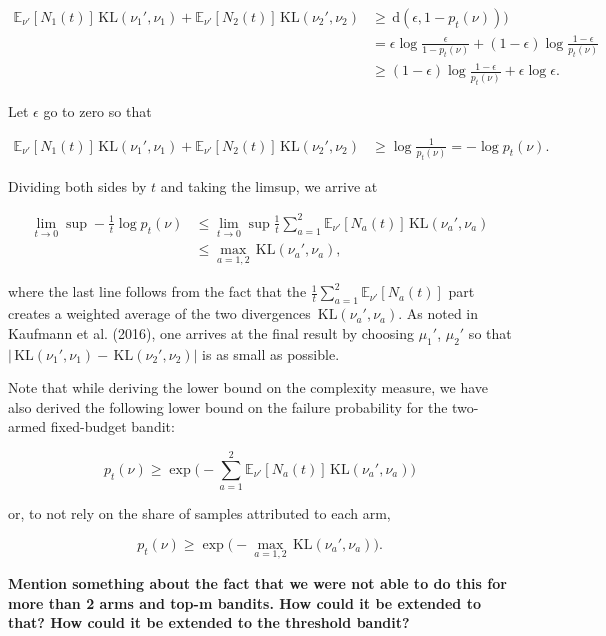 \documentclass[12pt,]{article}
\newcommand{\KL}{\,\text{KL}}
\newcommand{\der}{\,\text{d}}
\begin{document}
\begin{align*}
\mathbb{E}_{\nu'}[N_1(t)]\KL(\nu_1', \nu_1) + \mathbb{E}_{\nu'}[N_2(t)]\KL(\nu_2', \nu_2) & \geq \der(\epsilon,1-p_t(\nu))) \\
& = \epsilon \log \frac{\epsilon}{1-p_t(\nu)} + (1-\epsilon) \log \frac{1-\epsilon}{p_t(\nu)} \\
& \geq (1-\epsilon) \log \frac{1-\epsilon}{p_t(\nu)} + \epsilon \log \epsilon.
\end{align*}

Let \(\epsilon\) go to zero so that

\begin{align*}
\mathbb{E}_{\nu'}[N_1(t)]\KL(\nu_1', \nu_1) + \mathbb{E}_{\nu'}[N_2(t)]\KL(\nu_2', \nu_2)
& \geq \log \frac{1}{p_t(\nu)} = -\log p_t(\nu).
\end{align*}

Dividing both sides by \(t\) and taking the limsup, we arrive at

\begin{align*}
\lim_{t \to 0} \sup - \frac{1}{t} \log p_t(\nu)
& \leq \lim_{t \to 0} \sup \frac{1}{t} \sum_{a=1}^2 \mathbb{E}_{\nu'}[N_a(t)] \KL(\nu_a', \nu_a) \\
& \leq \max_{a=1,2} \KL(\nu_a', \nu_a),
\end{align*}

where the last line follows from the fact that the
\(\frac{1}{t} \sum_{a=1}^2 \mathbb{E}_{\nu'}[N_a(t)]\) part creates a
weighted average of the two divergences \(\KL(\nu_a', \nu_a)\). As noted
in Kaufmann et al. (2016), one arrives at the final result by choosing
\(\mu_1'\), \(\mu_2'\) so that
\(| \KL(\nu_1', \nu_1) - \KL(\nu_2', \nu_2) |\) is as small as possible.

Note that while deriving the lower bound on the complexity measure, we
have also derived the following lower bound on the failure probability
for the two-armed fixed-budget bandit:

\begin{equation*}
p_t(\nu) \geq \exp \big(- \sum_{a=1}^2 \mathbb{E}_{\nu'}[N_a(t)] \KL(\nu_a', \nu_a) \big)
\end{equation*}

or, to not rely on the share of samples attributed to each arm,

\begin{equation*}
p_t(\nu) \geq \exp \big(- \max_{a=1,2} \KL(\nu_a', \nu_a) \big).
\end{equation*}

\textbf{Mention something about the fact that we were not able to do
this for more than 2 arms and top-m bandits. How could it be extended to
that? How could it be extended to the threshold bandit?}
\end{document}
